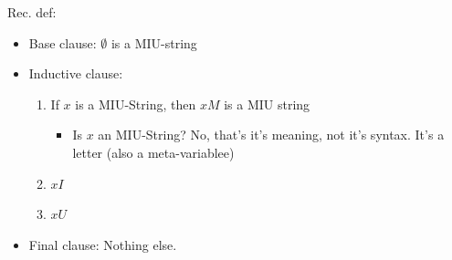 \documentclass[11pt]{article}
\begin{document}
Rec. def: 
\begin{itemize}
\item Base clause: \(\emptyset\) is a MIU-string
\item Inductive clause:
\begin{enumerate}
\item If \(x\) is a MIU-String, then \(xM\) is a MIU string
\begin{itemize}
\item Is \(x\) an MIU-String? No, that's it's meaning, not it's syntax. It's a letter (also a meta-variablee)
\end{itemize}
\item \(xI\)
\item \(xU\)
\end{enumerate}
\item Final clause: Nothing else.
\end{itemize}
\end{document}

